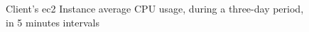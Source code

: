 \begin{figure}[!htbp]
    \centering
    \caption[Client CPU Usage Example]{Client's \gls{ec2} Instance average CPU usage, during a three-day period, in 5 minutes intervals}
    \label{fig:caesb-cpu-usage}
\end{figure}
    